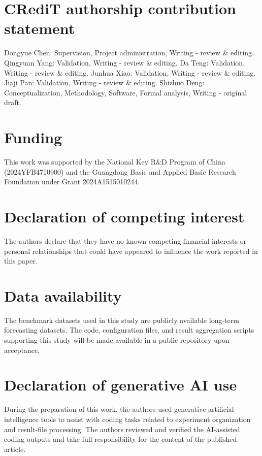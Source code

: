 \documentclass[a4paper,fleqn]{cas-sc}
\begin{document}
\section*{CRediT authorship contribution statement}
Dongyue Chen: Supervision, Project administration, Writing - review \& editing. Qingyuan Yang: Validation, Writing - review \& editing. Da Teng: Validation, Writing - review \& editing. Junhua Xiao: Validation, Writing - review \& editing. Jiaji Pan: Validation, Writing - review \& editing. Shizhuo Deng: Conceptualization, Methodology, Software, Formal analysis, Writing - original draft.

\section*{Funding}
This work was supported by the National Key R\&D Program of China (2024YFB4710900) and the Guangdong Basic and Applied Basic Research Foundation under Grant 2024A1515010244.

\section*{Declaration of competing interest}
The authors declare that they have no known competing financial interests or personal relationships that could have appeared to influence the work reported in this paper.

\section*{Data availability}
The benchmark datasets used in this study are publicly available long-term forecasting datasets. The code, configuration files, and result aggregation scripts supporting this study will be made available in a public repository upon acceptance.

\section*{Declaration of generative AI use}
During the preparation of this work, the authors used generative artificial intelligence tools to assist with coding tasks related to experiment organization and result-file processing. The authors reviewed and verified the AI-assisted coding outputs and take full responsibility for the content of the published article.
\end{document}
